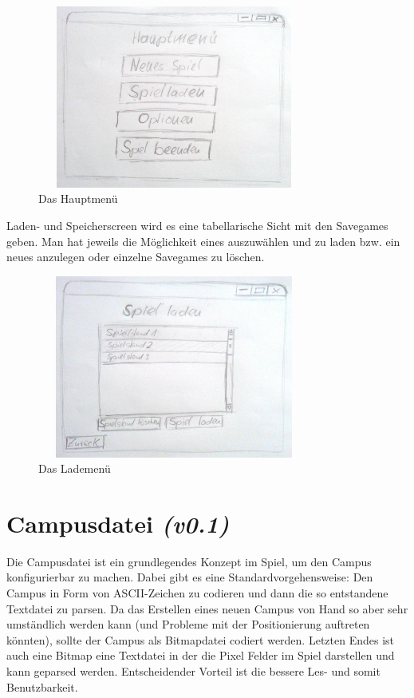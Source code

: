 \begin{figure}[htb]
	\begin{center}
		\includegraphics[width=9cm, height=6cm]{kapitel/ui/menu_main_small.jpg}
	\end{center}
	\caption{Das Hauptmenü}
	\label{fig:menu_main}
\end{figure}
Laden- und Speicherscreen wird es eine tabellarische Sicht mit den \glspl{Savegame} geben. Man hat jeweils
die Möglichkeit eines auszuwählen und zu laden bzw. ein neues anzulegen oder einzelne \glspl{Savegame} zu 
löschen.
\begin{figure}[htb]
	\begin{center}
		\includegraphics[width=9cm, height=6cm]{kapitel/ui/menu_load_small.jpg}
	\end{center}
	\caption{Das Lademenü}
	\label{fig:menu_load}
\end{figure}

\newpage
\section{Campusdatei \textit{(v0.1)}}
Die Campusdatei ist ein grundlegendes Konzept im Spiel, um den Campus konfigurierbar zu machen.
Dabei gibt es eine Standardvorgehensweise: Den Campus in Form von ASCII-Zeichen zu codieren
und dann die so entstandene Textdatei zu parsen. Da das Erstellen eines neuen Campus von Hand
so aber sehr umständlich werden kann (und Probleme mit der Positionierung auftreten könnten),
sollte der Campus als Bitmapdatei codiert werden. Letzten Endes ist auch eine Bitmap eine Textdatei
in der die Pixel Felder im Spiel darstellen und kann geparsed werden. Entscheidender Vorteil ist die 
bessere Les- und somit Benutzbarkeit.

